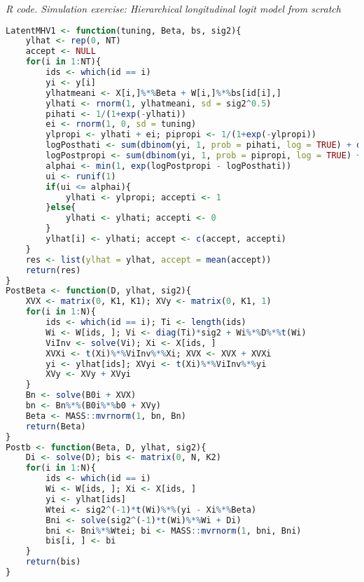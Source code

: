 \begin{enumerate}[leftmargin=*]
\begin{tcolorbox}[enhanced,width=4.67in,center upper,
	fontupper=\large\bfseries,drop shadow southwest,sharp corners]
	\textit{R code. Simulation exercise: Hierarchical longitudinal logit model from scratch}
	\begin{VF}
		\begin{lstlisting}[language=R]
LatentMHV1 <- function(tuning, Beta, bs, sig2){
	ylhat <- rep(0, NT)
	accept <- NULL
	for(i in 1:NT){
		ids <- which(id == i)
		yi <- y[i]
		ylhatmeani <- X[i,]%*%Beta + W[i,]%*%bs[id[i],]
		ylhati <- rnorm(1, ylhatmeani, sd = sig2^0.5)
		pihati <- 1/(1+exp(-ylhati))
		ei <- rnorm(1, 0, sd = tuning)
		ylpropi <- ylhati + ei; pipropi <- 1/(1+exp(-ylpropi))
		logPosthati <- sum(dbinom(yi, 1, prob = pihati, log = TRUE) + dnorm(ylhati, ylhatmeani, sig2^0.5, log = TRUE))
		logPostpropi <- sum(dbinom(yi, 1, prob = pipropi, log = TRUE) + dnorm(ylpropi, ylhatmeani, sig2^0.5, log = TRUE))
		alphai <- min(1, exp(logPostpropi - logPosthati))
		ui <- runif(1)
		if(ui <= alphai){
			ylhati <- ylpropi; accepti <- 1
		}else{
			ylhati <- ylhati; accepti <- 0
		}
		ylhat[i] <- ylhati; accept <- c(accept, accepti)
	}
	res <- list(ylhat = ylhat, accept = mean(accept))
	return(res)
}
PostBeta <- function(D, ylhat, sig2){
	XVX <- matrix(0, K1, K1); XVy <- matrix(0, K1, 1)
	for(i in 1:N){
		ids <- which(id == i); Ti <- length(ids)
		Wi <- W[ids, ]; Vi <- diag(Ti)*sig2 + Wi%*%D%*%t(Wi)
		ViInv <- solve(Vi); Xi <- X[ids, ]
		XVXi <- t(Xi)%*%ViInv%*%Xi; XVX <- XVX + XVXi
		yi <- ylhat[ids]; XVyi <- t(Xi)%*%ViInv%*%yi
		XVy <- XVy + XVyi
	}
	Bn <- solve(B0i + XVX)
	bn <- Bn%*%(B0i%*%b0 + XVy)
	Beta <- MASS::mvrnorm(1, bn, Bn)
	return(Beta)
}
Postb <- function(Beta, D, ylhat, sig2){
	Di <- solve(D); bis <- matrix(0, N, K2)
	for(i in 1:N){
		ids <- which(id == i)
		Wi <- W[ids, ]; Xi <- X[ids, ]
		yi <- ylhat[ids]
		Wtei <- sig2^(-1)*t(Wi)%*%(yi - Xi%*%Beta)
		Bni <- solve(sig2^(-1)*t(Wi)%*%Wi + Di)
		bni <- Bni%*%Wtei; bi <- MASS::mvrnorm(1, bni, Bni)
		bis[i, ] <- bi
	}
	return(bis)
}
\end{lstlisting}
	\end{VF}
\end{tcolorbox}



\end{enumerate}
